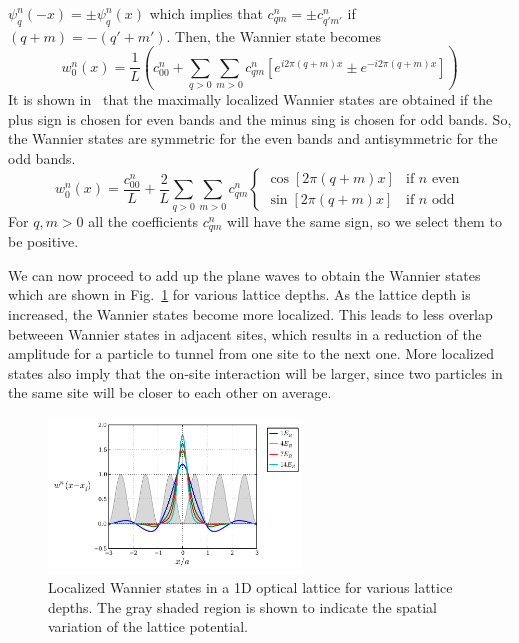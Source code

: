 \documentclass[oneside,11pt]{memoir}
\begin{document}
$\psi_{q}^{n}(-x) = \pm \psi_{q}^{n}(x)$ which implies that $c_{qm}^{n} = \pm
c_{q'm'}^{n}$ if  $(q+m) = -(q'+m')$.  Then, the Wannier state becomes
\begin{equation}
  w_{0}^{n}(x)= 
    \frac{1}{L} \left(
   c_{00}^{n} + 
    \sum_{q>0} 
   \sum_{m > 0 } 
   c_{qm}^{n} \left[ e^{i 2\pi(q+m)x} \pm e^{-i 2\pi(q+m)x } \right] \right)
\end{equation}
It is shown in~\cite{Kohn1959} that the maximally localized Wannier states are
obtained if the plus sign is chosen for even bands and the minus sing is chosen
for odd bands.  So, the Wannier states are symmetric for the even bands and
antisymmetric for the odd bands.  \begin{equation}
  w_{0}^{n}(x)= 
    \frac{c_{00}^{n}}{L}
   + 
    \frac{2}{L}
    \sum_{q>0} 
   \sum_{m > 0 } 
   c_{qm}^{n} 
\begin{cases}
\cos[ 2\pi(q+m)x ] & \text{if $n$ even} \\
\sin[ 2\pi(q+m)x ] & \text{if $n$ odd }
\end{cases}
\end{equation}
For $q,m>0$ all the coefficients $c_{qm}^{n}$ will have the same sign, so we
select them to be positive.  

We can now proceed to add up the plane waves to  obtain the Wannier states
which are shown in Fig.~\ref{fig:wannier1d_V0} for various lattice depths.   As
the lattice depth is increased, the Wannier states become more localized.  This
leads to less overlap betweeen Wannier states in adjacent sites, which results
in a reduction of the amplitude for a particle to tunnel from one site to the
next one.   More localized states also imply that the on-site interaction will
be larger, since two particles in the same site will be closer to each other on
average. 
\begin{figure}
\centering \includegraphics[width=0.6\textwidth]{../figures/BandStructure_figures/wannier1d_V0.pdf}
\caption[Wannier states in 1D lattice for various lattice depths.]{\small
Localized Wannier states in a 1D optical lattice for various lattice depths.
The gray shaded region is shown to  indicate the spatial variation of the
lattice potential.
} \label{fig:wannier1d_V0}
\end{figure}
\end{document}
